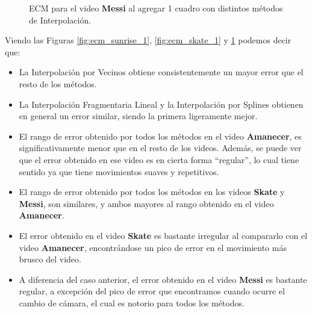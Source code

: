 \begin{figure}[H]
	\centering
	\caption{ECM para el video \textbf{Messi}  al agregar 1 cuadro con distintos métodos de Interpolación.}
	\label{fig:ecm_messi_1}
\end{figure}

Viendo las Figuras \ref{fig:ecm_sunrise_1}, \ref{fig:ecm_skate_1} y \ref{fig:ecm_messi_1} podemos decir que:
\begin{itemize}
    \item La Interpolación por Vecinos obtiene consistentemente un mayor error que
        el resto de los métodos.
    \item La Interpolación Fragmentaria Lineal y la Interpolación por Splines obtienen
        en general un error similar, siendo la primera ligeramente mejor.
    \item El rango de error obtenido por todos los métodos en el video \textbf{Amanecer},
        es significativamente menor que en el resto de los videos. Además, se puede ver
        que el error obtenido en ese video es en cierta forma ``regular'', lo cual
        tiene sentido ya que tiene movimientos suaves y repetitivos.
    \item El rango de error obtenido por todos los métodos en los videos \textbf{Skate} y \textbf{Messi},
        son similares, y ambos mayores al rango obtenido en el video \textbf{Amanecer}.
    \item El error obtenido en el video \textbf{Skate} es bastante irregular
        al compararlo con el video \textbf{Amanecer}, encontrándose un pico de error
        en el movimiento más brusco del video.
    \item A diferencia del caso anterior, el error obtenido en el video \textbf{Messi}
        es bastante regular, a excepción del pico de error que encontramos cuando
        ocurre el cambio de cámara, el cual es notorio para todos los métodos.
\end{itemize}

